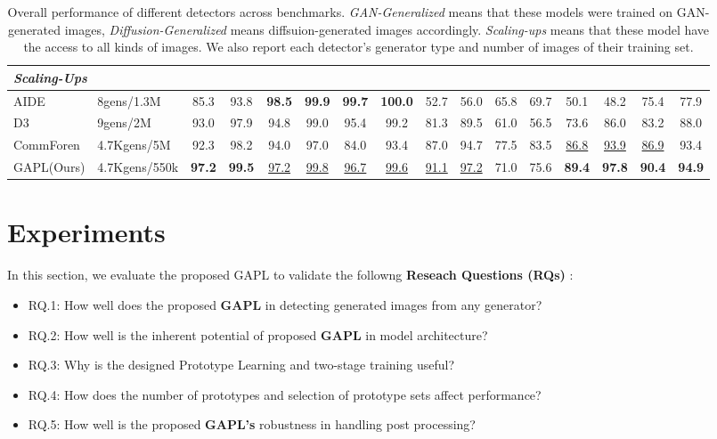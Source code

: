 \begin{table}[h]
{\begin{tabular}{l l cc cc cc cc cc cc cc}
\midrule
\multicolumn{16}{l}{\cellcolor{gray!25}\textit{Scaling-Ups}} \\
\midrule
AIDE \cite{yan2024sanity} & 8gens/1.3M & 85.3 & 93.8 & \textbf{98.5} & \textbf{99.9} & \textbf{99.7} & \textbf{100.0} & 52.7 & 56.0 & 65.8 & 69.7 & 50.1 & 48.2 & 75.4 & 77.9 \\
D3 \cite{yang2025d3} & 9gens/2M & 93.0 & 97.9 & 94.8 & 99.0 & 95.4 & 99.2 & 81.3 & 89.5 & 61.0 & 56.5 & 73.6 & 86.0 & 83.2 & 88.0 \\
CommForen \cite{park2025commfor} & 4.7Kgens/5M & 92.3 & 98.2 & 94.0 & 97.0 & 84.0 & 93.4 &  87.0 & 94.7 & 77.5 & 83.5 & \underline{86.8} & \underline{93.9} & \underline{86.9} & 93.4 \\
\rowcolor{cvprblue!20}
GAPL(Ours) & 4.7Kgens/550k & \textbf{97.2} & \textbf{99.5} & \underline{97.2} & \underline{99.8} & \underline{96.7} & \underline{99.6} & \underline{91.1} & \underline{97.2} & 71.0 & 75.6 & \textbf{89.4} & \textbf{97.8} & \textbf{90.4} & \textbf{94.9} \\ 
\bottomrule
\end{tabular}
}
\caption{Overall performance of different detectors across benchmarks. \textit{GAN-Generalized} means that these models were trained on GAN-generated images, \textit{Diffusion-Generalized} means diffsuion-generated images accordingly. \textit{Scaling-ups} means that these model have the access to all kinds of images. We also report each detector's generator type and number of images of their training set.}
\label{exp1}
\end{table}


\section{Experiments}

In this section, we evaluate the proposed GAPL to validate the followng \textbf{Reseach Questions (RQs)} :
\begin{itemize}
    \item RQ.1: How well does the proposed \textbf{GAPL} in detecting generated images from any generator?
    \item RQ.2: How well is the inherent potential of proposed \textbf{GAPL} in model architecture?
    \item RQ.3: Why is the designed Prototype Learning and two-stage training useful?
    \item RQ.4: How does the number of prototypes and selection of prototype sets affect performance?
    \item RQ.5: How well is the proposed \textbf{GAPL's} robustness in handling post processing?
\end{itemize}

